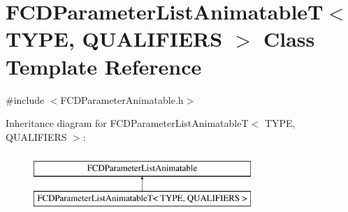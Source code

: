 \hypertarget{classFCDParameterListAnimatableT}{
\section{FCDParameterListAnimatableT$<$ TYPE, QUALIFIERS $>$ Class Template Reference}
\label{classFCDParameterListAnimatableT}
}


{\ttfamily \#include $<$FCDParameterAnimatable.h$>$}

Inheritance diagram for FCDParameterListAnimatableT$<$ TYPE, QUALIFIERS $>$:\begin{figure}[H]
\begin{center}
\leavevmode
\includegraphics[height=2.000000cm]{classFCDParameterListAnimatableT}
\end{center}
\end{figure}
